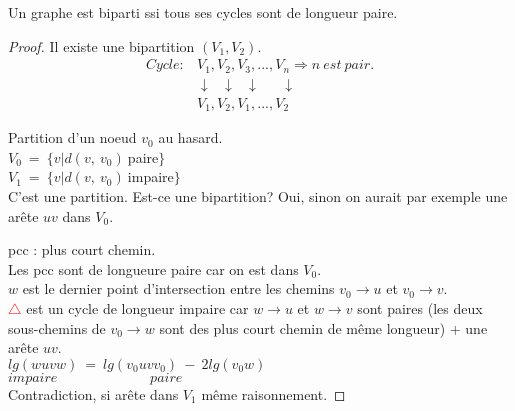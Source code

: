 \begin{mytheo} 
  Un graphe est biparti ssi tous ses cycles sont de longueur paire.
  \begin{proof}
    \noindent
    \newline
    \fbox{$\Longrightarrow$}
    \newline
    Il existe une bipartition $(V_1,V_2)$.\\
    \begin{align*}
      Cycle : & V_1, V_2, V_3, ..., V_n \Rightarrow n\ est\ pair.\\
              & \downarrow\ \ \ \downarrow\ \ \ \downarrow\ \ \ \ \ \ \ \downarrow\\
              & V_1, V_2, V_1, ..., V_2
    \end{align*}

    \noindent
    \fbox{$\Longleftarrow$}
    \newline
    Partition d'un noeud $v_0$ au hasard.\\
    $V_0\ =\ \{v|d(v,\ v_0)\ $paire$\}$\\
    $V_1\ =\ \{v|d(v,\ v_0)\ $impaire$\}$\\
    C'est une partition. Est-ce une bipartition?
    Oui, sinon on aurait par exemple une arête $uv$ dans $V_0$.

    \begin{center}
    \end{center}
    pcc : plus court chemin.\\
    Les pcc sont de longueure paire car on est dans $V_0$.\\
    $w$ est le dernier point d'intersection entre les chemins $v_0 \to u$ et $v_0 \to v$.\\
    \textcolor{red}{$\triangle$} est un cycle de longueur impaire car $w \to u$ et $w \to v$ sont paires (les deux sous-chemins de $v_0 \to w$ sont des plus court chemin de même longueur) + une arête $uv$.\\
    $lg(wuvw)\ =\ lg(v_{0}uvv_0)\ - \ 2lg(v_0w)$\\
    $impaire\ \ \ \ \ \ \ \ \ \ \ \ \ \ \ \ \ \ \ \ \ \ \ \ \ \ \ \ \ \ paire$\\
    Contradiction, si arête dans $V_1$ même raisonnement.
  \end{proof}
\end{mytheo}
